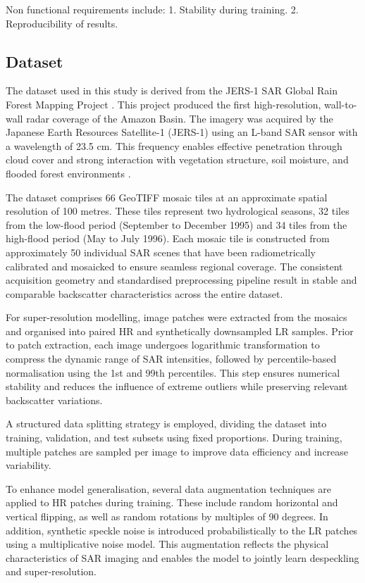 \documentclass[conference]{IEEEtran}
\begin{document}
Non functional requirements include:
1. Stability during training.
2. Reproducibility of results.
\subsection{Dataset}
The dataset used in this study is derived from the JERS-1 SAR Global Rain Forest Mapping Project \cite{chapman2015jers1}. This project produced the first high-resolution, wall-to-wall radar coverage of the Amazon Basin. The imagery was acquired by the Japanese Earth Resources Satellite-1 (JERS-1) using an L-band SAR sensor with a wavelength of 23.5 cm. This frequency enables effective penetration through cloud cover and strong interaction with vegetation structure, soil moisture, and flooded forest environments \cite{chapman2015jers1}.

The dataset comprises 66 GeoTIFF mosaic tiles at an approximate spatial resolution of 100 metres. These tiles represent two hydrological seasons, 32 tiles from the low-flood period (September to December 1995) and 34 tiles from the high-flood period (May to July 1996). Each mosaic tile is constructed from approximately 50 individual SAR scenes that have been radiometrically calibrated and mosaicked to ensure seamless regional coverage. The consistent acquisition geometry and standardised preprocessing pipeline result in stable and comparable backscatter characteristics across the entire dataset\cite{chapman2015jers1}.

For super-resolution modelling, image patches were extracted from the mosaics and organised into paired HR and synthetically downsampled LR samples. Prior to patch extraction, each image undergoes logarithmic transformation to compress the dynamic range of SAR intensities, followed by percentile-based normalisation using the 1st and 99th percentiles. This step ensures numerical stability and reduces the influence of extreme outliers while preserving relevant backscatter variations.

A structured data splitting strategy is employed, dividing the dataset into training, validation, and test subsets using fixed proportions. During training, multiple patches are sampled per image to improve data efficiency and increase variability.

To enhance model generalisation, several data augmentation techniques are applied to HR patches during training. These include random horizontal and vertical flipping, as well as random rotations by multiples of 90 degrees. In addition, synthetic speckle noise is introduced probabilistically to the LR patches using a multiplicative noise model. This augmentation reflects the physical characteristics of SAR imaging and enables the model to jointly learn despeckling and super-resolution.
\end{document}
